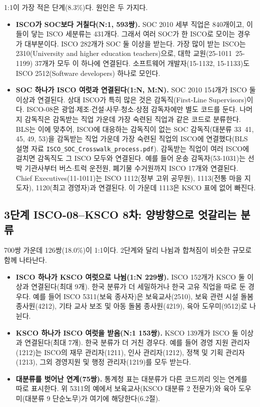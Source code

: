 \documentclass[11pt]{article}
\begin{document}
1:1이 가장 적은 단계(8.3\%)다. 원인은 두 가지다.
\begin{itemize}[leftmargin=*]
  \item \textbf{ISCO가 SOC보다 거칠다(N:1, 593쌍).} SOC 2010 세부 직업은 840개이고, 이들이 닿는 ISCO 세분류는 431개다. 그래서 여러 SOC가 한 ISCO로 모이는 경우가 대부분이다. ISCO 282개가 SOC 둘 이상을 받는다. 가장 많이 받는 ISCO는 2310(University and higher education teachers)으로, 대학 교원(25-1011~25-1199) 37개가 모두 이 하나에 연결된다. 소프트웨어 개발자(15-1132, 15-1133)도 ISCO 2512(Software developers) 하나로 모인다.
  \item \textbf{SOC 하나가 ISCO 여럿과 연결된다(1:N, M:N).} SOC 2010 154개가 ISCO 둘 이상과 연결된다. 상대 ISCO가 특히 많은 것은 감독직(First-Line Supervisors)이다. ISCO-08은 광업$\cdot$제조$\cdot$건설$\cdot$사무$\cdot$청소$\cdot$상점 감독자에만 별도 코드를 둔다. 나머지 감독직은 감독받는 직업 가운데 가장 숙련된 직업과 같은 코드로 분류한다. BLS는 이에 맞추어, ISCO에 대응하는 감독직이 없는 SOC 감독직(대분류 33~41, 45, 49, 53)을 감독받는 직업 가운데 가장 숙련된 직업의 ISCO에 연결했다(BLS 설명 자료 \texttt{ISCO\_SOC\_Crosswalk\_process.pdf}). 감독받는 직업이 여러 ISCO에 걸치면 감독직도 그 ISCO 모두와 연결된다. 예를 들어 운송 감독자(53-1031)는 선박 기관사부터 버스$\cdot$트럭 운전원, 폐기물 수거원까지 ISCO 17개와 연결된다. Chief Executives(11-1011)는 ISCO 1112(정부 고위 공무원), 1113(전통 마을 지도자), 1120(최고 경영자)과 연결된다. 이 가운데 1113은 KSCO 표에 없어 빠진다.
\end{itemize}

\subsection{3단계 ISCO-08–KSCO 8차: 양방향으로 엇갈리는 분류}

700쌍 가운데 126쌍(18.0\%)이 1:1이다. 2단계와 달리 나뉨과 합쳐짐이 비슷한 규모로 함께 나타난다.
\begin{itemize}[leftmargin=*]
  \item \textbf{ISCO 하나가 KSCO 여럿으로 나뉨(1:N 229쌍).} ISCO 152개가 KSCO 둘 이상과 연결된다(최대 9개). 한국 분류가 더 세밀하거나 한국 고유 직업을 따로 둔 경우다. 예를 들어 ISCO 5311(보육 종사자)은 보육교사(2510), 보육 관련 시설 돌봄 종사원(4212), 기타 교사 보조 및 아동 돌봄 종사원(4219), 육아 도우미(9512)로 나뉜다.
  \item \textbf{KSCO 하나가 ISCO 여럿을 받음(N:1 153쌍).} KSCO 139개가 ISCO 둘 이상과 연결된다(최대 7개). 한국 분류가 더 거친 경우다. 예를 들어 경영 지원 관리자(1212)는 ISCO의 재무 관리자(1211), 인사 관리자(1212), 정책 및 기획 관리자(1213), 그외 경영지원 및 행정 관리자(1219)를 모두 받는다.
  \item \textbf{대분류를 벗어난 연계(75쌍).} 통계청 표는 대분류가 다른 코드끼리 잇는 연계를 따로 표시한다. 위 5311의 예에서 보육교사(KSCO 대분류 2 전문가)와 육아 도우미(대분류 9 단순노무)가 여기에 해당한다(6.2절).
\end{itemize}
\end{document}
